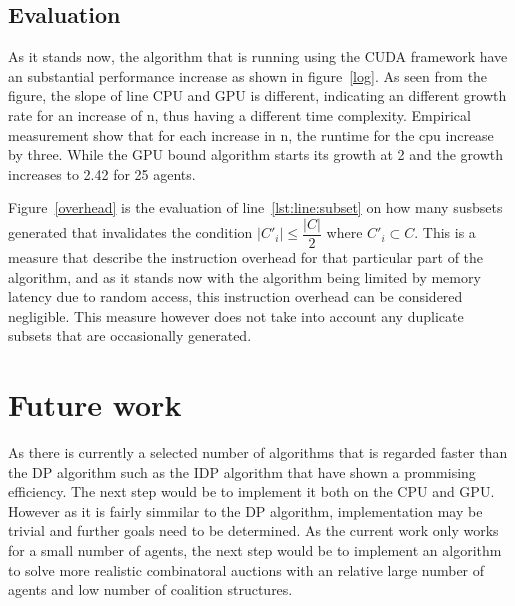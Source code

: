 \documentclass[a4paper, 12pt]{report}
\begin{document}
\subsection{Evaluation}
As it stands now, the algorithm that is running using the CUDA framework have an substantial performance increase as shown in figure~\ref{log}. As seen from the figure, the slope of line CPU and GPU is different, indicating an different growth rate for an increase of n, thus having a different time complexity. Empirical measurement show that for each increase in n, the runtime for the cpu increase by three. While the GPU bound algorithm starts its growth at 2 and the growth increases to 2.42 for 25 agents.

Figure~\ref{overhead} is the evaluation of line~\ref{lst:line:subset} on how many susbsets generated that invalidates the condition $\vert C'_{i} \vert \leq \dfrac{\vert C\vert }{2}$ where $C'_i \subset C$. This is a measure that describe the instruction overhead for that particular part of the algorithm, and as it stands now with the algorithm being limited by memory latency due to random access, this instruction overhead can be considered negligible. This measure however does not take into account any duplicate subsets that are occasionally generated.
\section{Future work}
As there is currently a selected number of algorithms that is regarded faster than the DP algorithm such as the IDP algorithm \citep{rahwan2008improved} that have shown a prommising efficiency. The next step would be to implement it both on the CPU and GPU. However as it is fairly simmilar to the DP algorithm, implementation may be trivial and further goals need to be determined. As the current work only works for a small number of agents, the next step would be to implement an algorithm to solve more realistic combinatoral auctions with an relative large number of agents and low number of coalition structures.



\end{document}
